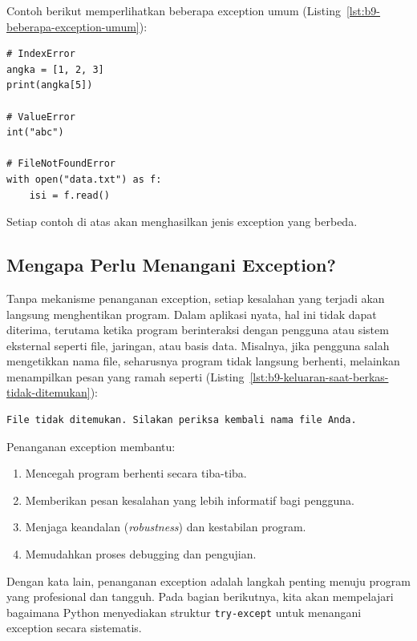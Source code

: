 Contoh berikut memperlihatkan beberapa exception umum (Listing~\ref{lst:b9-beberapa-exception-umum}):

\begin{lstlisting}[style=PythonStyle, caption={Beberapa contoh exception umum}, label={lst:b9-beberapa-exception-umum}]
# IndexError
angka = [1, 2, 3]
print(angka[5])

# ValueError
int("abc")

# FileNotFoundError
with open("data.txt") as f:
    isi = f.read()
\end{lstlisting}

Setiap contoh di atas akan menghasilkan jenis exception yang berbeda.

\subsection*{Mengapa Perlu Menangani Exception?}

Tanpa mekanisme penanganan exception, setiap kesalahan yang terjadi akan langsung menghentikan program. Dalam aplikasi nyata, hal ini tidak dapat diterima, terutama ketika program berinteraksi dengan pengguna atau sistem eksternal seperti file, jaringan, atau basis data. Misalnya, jika pengguna salah mengetikkan nama file, seharusnya program tidak langsung berhenti, melainkan menampilkan pesan yang ramah seperti (Listing~\ref{lst:b9-keluaran-saat-berkas-tidak-ditemukan}):

\begin{lstlisting}[language=bash, caption={Keluaran saat berkas tidak ditemukan}, label={lst:b9-keluaran-saat-berkas-tidak-ditemukan}]
File tidak ditemukan. Silakan periksa kembali nama file Anda.
\end{lstlisting}

Penanganan exception membantu:
\begin{enumerate}
    \item Mencegah program berhenti secara tiba-tiba.
    \item Memberikan pesan kesalahan yang lebih informatif bagi pengguna.
    \item Menjaga keandalan (\textit{robustness}) dan kestabilan program.
    \item Memudahkan proses debugging dan pengujian.
\end{enumerate}

Dengan kata lain, penanganan exception adalah langkah penting menuju program yang profesional dan tangguh. Pada bagian berikutnya, kita akan mempelajari bagaimana Python menyediakan struktur \texttt{try-except} untuk menangani exception secara sistematis.


